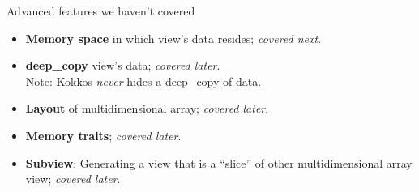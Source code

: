 
\iffull
\begin{frame}[fragile]{Advanced features we haven't covered}

  \begin{itemize}

  \item {\textbf{Memory space} in which view's data resides;
         \textit{covered next}.}

  \item {\textbf{deep\_copy} view's data; \textit{covered later}. \\
        Note: Kokkos \textit{never} hides a deep\_copy of data.}

  \item {\textbf{Layout} of multidimensional array; \textit{covered later}.}

  \item {\textbf{Memory traits}; \textit{covered later}.}

  \item {\textbf{Subview}: Generating a view that is a ``slice'' of other multidimensional array view; \textit{covered later}.}

  \end{itemize}

\end{frame}
\fi

